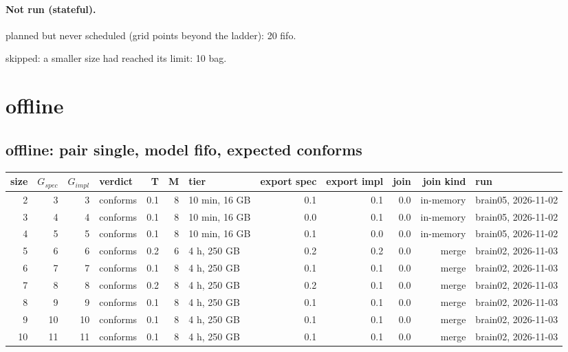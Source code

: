 \documentclass[10pt]{article}
\begin{document}
\paragraph{Not run (stateful).}
planned but never scheduled (grid points beyond the ladder): 20 fifo.\par
skipped: a smaller size had reached its limit: 10 bag.\par
\section*{offline}
\subsection*{offline: pair \textsf{single}, model fifo, expected conforms}
\begin{longtable}{@{}rrrlrrlrrrrl@{}}
\toprule
size & $G_{\mathit{spec}}$ & $G_{\mathit{impl}}$ & verdict & T & M & tier & export spec & export impl & join & join kind & run \\
\midrule
\endhead
\color{red} 2 & 3 & 3 & conforms & 0.1 & 8 & 10 min, 16 GB & 0.1 & 0.1 & 0.0 & in-memory & brain05, 2026-11-02 \\
\color{red} 3 & 4 & 4 & conforms & 0.1 & 8 & 10 min, 16 GB & 0.0 & 0.1 & 0.0 & in-memory & brain05, 2026-11-02 \\
\color{red} 4 & 5 & 5 & conforms & 0.1 & 8 & 10 min, 16 GB & 0.1 & 0.0 & 0.0 & in-memory & brain05, 2026-11-02 \\
\color{blue} 5 & 6 & 6 & conforms & 0.2 & 6 & 4 h, 250 GB & 0.2 & 0.2 & 0.0 & merge & brain02, 2026-11-03 \\
\color{blue} 6 & 7 & 7 & conforms & 0.1 & 8 & 4 h, 250 GB & 0.1 & 0.1 & 0.0 & merge & brain02, 2026-11-03 \\
\color{blue} 7 & 8 & 8 & conforms & 0.2 & 8 & 4 h, 250 GB & 0.2 & 0.1 & 0.0 & merge & brain02, 2026-11-03 \\
\color{blue} 8 & 9 & 9 & conforms & 0.1 & 8 & 4 h, 250 GB & 0.1 & 0.1 & 0.0 & merge & brain02, 2026-11-03 \\
\color{blue} 9 & 10 & 10 & conforms & 0.1 & 8 & 4 h, 250 GB & 0.1 & 0.1 & 0.0 & merge & brain02, 2026-11-03 \\
\color{blue} 10 & 11 & 11 & conforms & 0.1 & 8 & 4 h, 250 GB & 0.1 & 0.1 & 0.0 & merge & brain02, 2026-11-03 \\
\bottomrule
\end{longtable}
\end{document}
